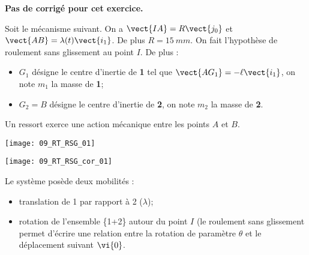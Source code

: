 \normalfalse \difficiletrue \tdifficilefalse
\correctiontrue

\setcounter{numques}{0}
\ifcorrection
\else
\textbf{Pas de corrigé pour cet exercice.}
\fi

\ifprof
\else
Soit le mécanisme suivant. On a $\vect{IA}=R\vect{j_0}$ et $\vect{AB}=\lambda(t)\vect{i_1}$. De plus $R=\SI{15}{mm}$.
On fait l'hypothèse de roulement sans glissement au point $I$. De plus :
\begin{itemize}
\item $G_1$ désigne le centre d'inertie de \textbf{1} tel que $\vect{AG_1}=-\ell\vect{i_1}$, on note $m_1$ la masse de \textbf{1};%
\item $G_2=B$ désigne le centre d'inertie de \textbf{2}, on note $m_2$ la masse de \textbf{2}.%
\end{itemize}
Un ressort exerce une action mécanique entre les points $A$ et $B$. 
\begin{center}
\texttt{[image: 09\_RT\_RSG\_01]}
\end{center}
\fi

\ifprof
\begin{center}
\texttt{[image: 09\_RT\_RSG\_cor\_01]}
\end{center}

\else
\fi

\ifprof
Le système posède deux mobilités : 
\begin{itemize}
\item translation de 1 par rapport à 2 ($\lambda$);
\item rotation de l'ensemble \{1+2\} autour du point $I$ (le roulement sans glissement permet d'écrire une relation entre la rotation de paramètre $\theta$ et le déplacement suivant $\vi{0}$.
\end{itemize}

